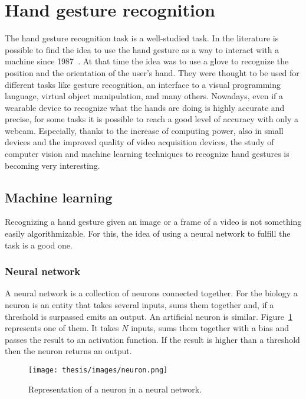\documentclass[../thesis.tex]{subfiles}
\begin{document}
\section{Hand gesture recognition}
The hand gesture recognition task is a well-studied task. In the literature is possible to find the idea to use the hand gesture as a way to interact with a machine since 1987~\cite{paper:hand_gesture_interface_device}. At that time the idea was to use a glove to recognize the position and the orientation of the user's hand. They were thought to be used for different tasks like gesture recognition, an interface to a visual programming language, virtual object manipulation, and many others. Nowadays, even if a wearable device to recognize what the hands are doing is highly accurate and precise, for some tasks it is possible to reach a good level of accuracy with only a webcam. Especially, thanks to the increase of computing power, also in small devices and the improved quality of video acquisition devices, the study of computer vision and machine learning techniques to recognize hand gestures is becoming very interesting.

\subsection{Machine learning}
Recognizing a hand gesture given an image or a frame of a video is not something easily algorithmizable. For this, the idea of using a neural network to fulfill the task is a good one.

\subsubsection{Neural network}
A neural network is a collection of neurons connected together. For the biology a neuron is an entity that takes several inputs, sums them together and, if a threshold is surpassed emits an output. An artificial neuron is similar. Figure~\ref{fig:neuron} represents one of them. It takes $N$ inputs, sums them together with a bias and passes the result to an activation function. If the result is higher than a threshold then the neuron returns an output.

\begin{figure}[H]
    \centering
    \texttt{[image: thesis/images/neuron.png]}
    \caption{Representation of a neuron in a neural network.}
    \label{fig:neuron}
\end{figure}
\end{document}
